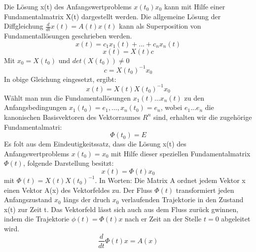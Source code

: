 Die Lösung x(t) des Anfangswertproblems $x(t_0) x_0$ kann mit Hilfe einer Fundamentalmatrix X(t) dargestellt werden. Die allgemeine Lösung der Diffgleichung $\frac{d}{dt}x(t) = A(t)x(t)$ kann als Superposition von Fundamentallösungen  geschrieben werden.\\
\begin{equation*}
x(t) = c_1 x_1(t) + ... + c_n x_n(t)
\end{equation*}
\begin{equation*}
x(t) = X(t)c
\end{equation*}
Mit $x_0 = X(t_0)$ und $det(X(t_0)) \neq 0$
\begin{equation*}
c = X(t_0)^{-1}x_0
\end{equation*}
In obige Gleichung eingesetzt, ergibt: 
\begin{equation*}
x(t) = X(t)X(t_0)^{-1}x_0
\end{equation*}
Wählt man nun die Fundamentallösungen $x_1(t) ... x_n(t)$ zu den Anfangsbedingungen $x_1(t_0)=e_1, ..., x_n(t_0)=e_n$, wobei $e_1...e_n$ die kanonischen Basisvektoren des Vektorraumes $R^n$ sind, erhalten wir die zugehörige Fundamentalmatri:
\begin{equation*}
\Phi(t_0) = E
\end{equation*}
Es folt aus dem Eindeutigkeitssatz, dass die Lösung x(t) des Anfangswertproblems $x(t_0) = x_0$ mit Hilfe dieser speziellen Fundamentalmatrix $\Phi(t)$, folgende Darstellung besitzt: 
\begin{equation*}
x(t) = \Phi(t)x_0
\end{equation*}
mit $\Phi(t) = X(t)X(t_0)^{-1}$. In Worten: Die Matrix A ordnet jedem Vektor x einen Vektor A(x) des Vektorfeldes zu. Der Fluss $\Phi(t)$ transformiert jeden Anfangszustand $x_0$ längs der druch $x_0$ verlaufenden Trajektorie in den Zustand x(t) zur Zeit t. 
Das Vektorfeld lässt sich auch aus dem Fluss zurück gwinnen, indem die Trajektorie $\phi(t) = \Phi(t)x$ nach er Zeit an der Stelle $t=0$ abgeleitet wird. 
\begin{equation*}
\frac{d}{dt}\Phi(t)x = A(x)
\end{equation*}
